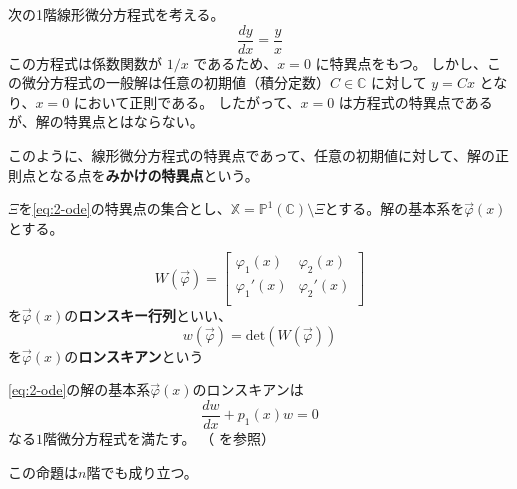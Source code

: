 \begin{example}[見掛けの特異点の例]\label{ex:apparent_singularity}
    次の1階線形微分方程式を考える。
    \begin{equation}\label{eq:apparent_ex}
    \frac{dy}{dx}=\frac{y}{x}
    \end{equation}
    この方程式は係数関数が $1/x$ であるため、$x=0$ に特異点をもつ。
    しかし、この微分方程式の一般解は任意の初期値（積分定数）$C \in \mathbb{C}$ に対して $y=Cx$ となり、$x=0$ において正則である。
    したがって、$x=0$ は方程式の特異点であるが、解の特異点とはならない。
\end{example}

\begin{definition}
    このように、線形微分方程式の特異点であって、任意の初期値に対して、解の正則点となる点を\textbf{みかけの特異点}という。
\end{definition}


$\Xi$を\eqref{eq:2-ode}の特異点の集合とし、$\mathbb{X}=\mathbb{P}^{1}(\mathbb{C})\setminus\Xi$とする。解の基本系を$\vec{\varphi}(x)$とする。

\begin{definition}
    \[
    W(\vec{\varphi})=
    \left[
    \begin{matrix}
        \varphi_{1}(x) & \varphi_{2}(x) \\
        \varphi_{1}'(x) & \varphi_{2}'(x) \\
    \end{matrix}
    \right]
    \]
    を$\vec{\varphi}(x)$の\textbf{ロンスキー行列}といい、
    \[
    w(\vec{\varphi})=\text{det}(W(\vec{\varphi}))
    \]
    を$\vec{\varphi}(x)$の\textbf{ロンスキアン}という
\end{definition}

\begin{proposition}\label{prop:2.1_wronskian-ode}
    \eqref{eq:2-ode}の解の基本系$\vec{\varphi}(x)$のロンスキアンは
    \[
    \frac{dw}{dx}+p_{1}(x)w=0
    \]
    なる$1$階微分方程式を満たす。
    （\cite[p.51 命題2.2]{book:okamoto} を参照）
\end{proposition}

この命題は$n$階でも成り立つ。

